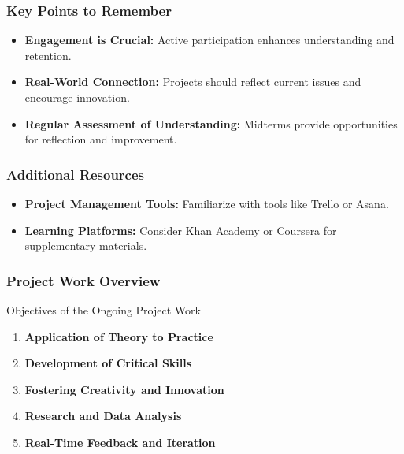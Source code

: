 \documentclass[aspectratio=169]{beamer}
\begin{document}
\begin{frame}[fragile]
    \frametitle{Key Points to Remember}
    \begin{itemize}
        \item \textbf{Engagement is Crucial:} Active participation enhances understanding and retention.
        \item \textbf{Real-World Connection:} Projects should reflect current issues and encourage innovation.
        \item \textbf{Regular Assessment of Understanding:} Midterms provide opportunities for reflection and improvement.
    \end{itemize}
\end{frame}

\begin{frame}[fragile]
    \frametitle{Additional Resources}
    \begin{itemize}
        \item \textbf{Project Management Tools:} Familiarize with tools like Trello or Asana.
        \item \textbf{Learning Platforms:} Consider Khan Academy or Coursera for supplementary materials.
    \end{itemize}
\end{frame}

\begin{frame}[fragile]
    \frametitle{Project Work Overview}
    \begin{block}{Objectives of the Ongoing Project Work}
        \begin{enumerate}
            \item \textbf{Application of Theory to Practice}
            \item \textbf{Development of Critical Skills}
            \item \textbf{Fostering Creativity and Innovation}
            \item \textbf{Research and Data Analysis}
            \item \textbf{Real-Time Feedback and Iteration}
        \end{enumerate}
    \end{block}
\end{frame}
\end{document}
